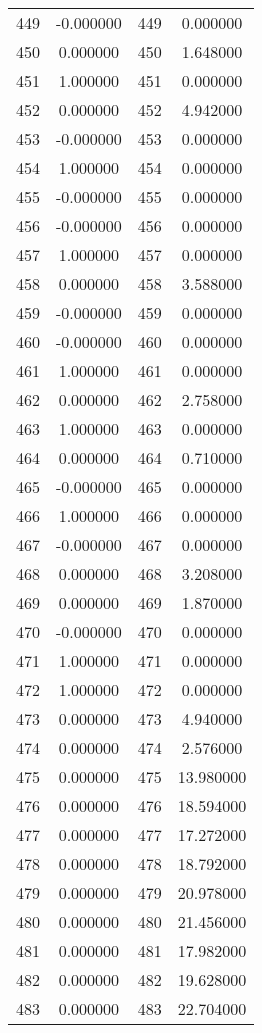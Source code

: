 \documentclass[12pt]{article}
\begin{document}
\begin{longtable}{@{}cccc@{}}
449 & -0.000000 & 449 & 0.000000 \\
450 & 0.000000 & 450 & 1.648000 \\
451 & 1.000000 & 451 & 0.000000 \\
452 & 0.000000 & 452 & 4.942000 \\
453 & -0.000000 & 453 & 0.000000 \\
454 & 1.000000 & 454 & 0.000000 \\
455 & -0.000000 & 455 & 0.000000 \\
456 & -0.000000 & 456 & 0.000000 \\
457 & 1.000000 & 457 & 0.000000 \\
458 & 0.000000 & 458 & 3.588000 \\
459 & -0.000000 & 459 & 0.000000 \\
460 & -0.000000 & 460 & 0.000000 \\
461 & 1.000000 & 461 & 0.000000 \\
462 & 0.000000 & 462 & 2.758000 \\
463 & 1.000000 & 463 & 0.000000 \\
464 & 0.000000 & 464 & 0.710000 \\
465 & -0.000000 & 465 & 0.000000 \\
466 & 1.000000 & 466 & 0.000000 \\
467 & -0.000000 & 467 & 0.000000 \\
468 & 0.000000 & 468 & 3.208000 \\
469 & 0.000000 & 469 & 1.870000 \\
470 & -0.000000 & 470 & 0.000000 \\
471 & 1.000000 & 471 & 0.000000 \\
472 & 1.000000 & 472 & 0.000000 \\
473 & 0.000000 & 473 & 4.940000 \\
474 & 0.000000 & 474 & 2.576000 \\
475 & 0.000000 & 475 & 13.980000 \\
476 & 0.000000 & 476 & 18.594000 \\
477 & 0.000000 & 477 & 17.272000 \\
478 & 0.000000 & 478 & 18.792000 \\
479 & 0.000000 & 479 & 20.978000 \\
480 & 0.000000 & 480 & 21.456000 \\
481 & 0.000000 & 481 & 17.982000 \\
482 & 0.000000 & 482 & 19.628000 \\
483 & 0.000000 & 483 & 22.704000 \\

\end{longtable}
\end{document}
